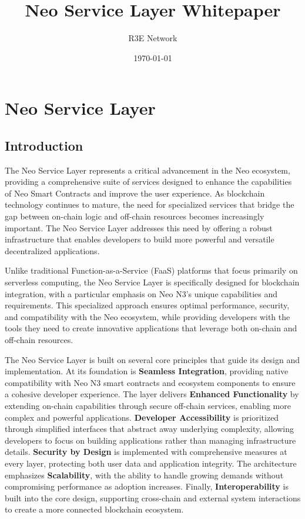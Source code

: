 \documentclass{article}
\title{Neo Service Layer Whitepaper}
\author{R3E Network}
\date{\today}
\begin{document}
\maketitle
\tableofcontents
\newpage

\section{Neo Service Layer}
\label{sec:neo-service-layer}

\subsection{Introduction}
\label{subsec:nsl-intro}

The Neo Service Layer represents a critical advancement in the Neo ecosystem, providing a comprehensive suite of services designed to enhance the capabilities of Neo Smart Contracts and improve the user experience. As blockchain technology continues to mature, the need for specialized services that bridge the gap between on-chain logic and off-chain resources becomes increasingly important. The Neo Service Layer addresses this need by offering a robust infrastructure that enables developers to build more powerful and versatile decentralized applications.

Unlike traditional Function-as-a-Service (FaaS) platforms that focus primarily on serverless computing, the Neo Service Layer is specifically designed for blockchain integration, with a particular emphasis on Neo N3's unique capabilities and requirements. This specialized approach ensures optimal performance, security, and compatibility with the Neo ecosystem, while providing developers with the tools they need to create innovative applications that leverage both on-chain and off-chain resources.

The Neo Service Layer is built on several core principles that guide its design and implementation. At its foundation is \textbf{Seamless Integration}, providing native compatibility with Neo N3 smart contracts and ecosystem components to ensure a cohesive developer experience. The layer delivers \textbf{Enhanced Functionality} by extending on-chain capabilities through secure off-chain services, enabling more complex and powerful applications. \textbf{Developer Accessibility} is prioritized through simplified interfaces that abstract away underlying complexity, allowing developers to focus on building applications rather than managing infrastructure details. \textbf{Security by Design} is implemented with comprehensive measures at every layer, protecting both user data and application integrity. The architecture emphasizes \textbf{Scalability}, with the ability to handle growing demands without compromising performance as adoption increases. Finally, \textbf{Interoperability} is built into the core design, supporting cross-chain and external system interactions to create a more connected blockchain ecosystem.
\end{document}
